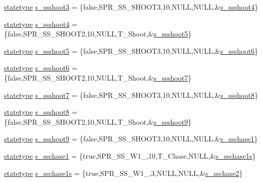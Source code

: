 \begin{DoxyCompactItemize}
\item 
\hyperlink{structstatestruct}{statetype} \hyperlink{WL__ACT2_8C_ab375d6f13bacc2be512c19659bf7ba19}{s\_\-ssshoot3} = \{false,SPR\_\-SS\_\-SHOOT3,10,NULL,NULL,\&\hyperlink{WL__ACT2_8C_acd69ff06a6d6270617ebe39b6d7409f6}{s\_\-ssshoot4}\}
\item 
\hyperlink{structstatestruct}{statetype} \hyperlink{WL__ACT2_8C_acd69ff06a6d6270617ebe39b6d7409f6}{s\_\-ssshoot4} = \{false,SPR\_\-SS\_\-SHOOT2,10,NULL,T\_\-Shoot,\&\hyperlink{WL__ACT2_8C_acbff952dcb34e0cc4fef324928b87db8}{s\_\-ssshoot5}\}
\item 
\hyperlink{structstatestruct}{statetype} \hyperlink{WL__ACT2_8C_acbff952dcb34e0cc4fef324928b87db8}{s\_\-ssshoot5} = \{false,SPR\_\-SS\_\-SHOOT3,10,NULL,NULL,\&\hyperlink{WL__ACT2_8C_a6203ac57c9d9f5068f84164d0137f790}{s\_\-ssshoot6}\}
\item 
\hyperlink{structstatestruct}{statetype} \hyperlink{WL__ACT2_8C_a6203ac57c9d9f5068f84164d0137f790}{s\_\-ssshoot6} = \{false,SPR\_\-SS\_\-SHOOT2,10,NULL,T\_\-Shoot,\&\hyperlink{WL__ACT2_8C_a0aeff7609fa865c0ba84fd271521bda5}{s\_\-ssshoot7}\}
\item 
\hyperlink{structstatestruct}{statetype} \hyperlink{WL__ACT2_8C_a0aeff7609fa865c0ba84fd271521bda5}{s\_\-ssshoot7} = \{false,SPR\_\-SS\_\-SHOOT3,10,NULL,NULL,\&\hyperlink{WL__ACT2_8C_a5e908bbb4160751f016f254339d35d1a}{s\_\-ssshoot8}\}
\item 
\hyperlink{structstatestruct}{statetype} \hyperlink{WL__ACT2_8C_a5e908bbb4160751f016f254339d35d1a}{s\_\-ssshoot8} = \{false,SPR\_\-SS\_\-SHOOT2,10,NULL,T\_\-Shoot,\&\hyperlink{WL__ACT2_8C_ae2d91316bf6aa10b5688aebefe89cd2a}{s\_\-ssshoot9}\}
\item 
\hyperlink{structstatestruct}{statetype} \hyperlink{WL__ACT2_8C_ae2d91316bf6aa10b5688aebefe89cd2a}{s\_\-ssshoot9} = \{false,SPR\_\-SS\_\-SHOOT3,10,NULL,NULL,\&\hyperlink{WL__DEF_8H_ae0f8e756abc0877ae24d5fd8e3b88bea}{s\_\-sschase1}\}
\item 
\hyperlink{structstatestruct}{statetype} \hyperlink{WL__ACT2_8C_ae0f8e756abc0877ae24d5fd8e3b88bea}{s\_\-sschase1} = \{true,SPR\_\-SS\_\-W1\_,10,T\_\-Chase,NULL,\&\hyperlink{WL__ACT2_8C_ae5a320f2d0fccd1596848af02f403dd3}{s\_\-sschase1s}\}
\item 
\hyperlink{structstatestruct}{statetype} \hyperlink{WL__ACT2_8C_ae5a320f2d0fccd1596848af02f403dd3}{s\_\-sschase1s} = \{true,SPR\_\-SS\_\-W1\_,3,NULL,NULL,\&\hyperlink{WL__ACT2_8C_a2a840ea76500e2b74c673759a7f78d8a}{s\_\-sschase2}\}
\item 

\end{DoxyCompactItemize}

